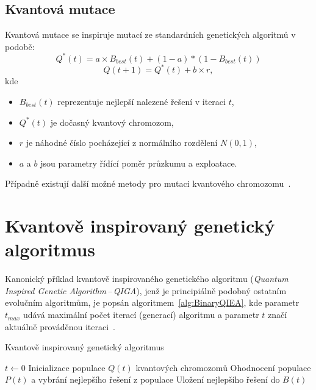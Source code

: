 \subsection{Kvantová mutace}\label{subsec:quantum-mutation}
Kvantová mutace se inspiruje mutací ze standardních genetických algoritmů v podobě:
\begin{equation*}
    Q^*(t) = a \times B_{best}(t) + (1 - a) * (1 - B_{best}(t))
\end{equation*}
\begin{equation*}
    Q(t+1) = Q^*(t) + b \times r,
\end{equation*}
kde
\begin{itemize}
    \item $B_{best}(t)$ reprezentuje nejlepší nalezené řešení v iteraci $t$,
    \item $Q^*(t)$ je dočasný kvantový chromozom,
    \item $r$ je náhodné číslo pocházející z normálního rozdělení $N(0,1)$,
    \item $a$ a $b$ jsou parametry řídící poměr průzkumu a exploatace.
\end{itemize}
Případně existují další možné metody pro mutaci kvantového chromozomu~\cite{NaturalComputing}.

\section{Kvantově inspirovaný genetický algoritmus}\label{sec:qiga}
Kanonický příklad kvantově inspirovaného genetického algoritmu (\emph{Quantum Inspired Genetic Algorithm\,--\,QIGA}), jenž je principiálně podobný ostatním evolučním algoritmům, je popsán algoritmem~\ref{alg:BinaryQIEA}, kde parametr $t_{max}$ udává maximální počet iterací (generací) algoritmu a parametr $t$ značí aktuálně prováděnou iteraci~\cite{NaturalComputing}. 

\begin{algorithm}[ht]
    \caption{Kvantově inspirovaný genetický algoritmus~\cite{NaturalComputing}}
    \label{alg:BinaryQIEA}
    $t \gets 0$\;
    Inicializace populace $Q(t)$ kvantových chromozomů\;
    Ohodnocení populace $P(t)$ a vybrání nejlepšího řešení z populace\;
    Uložení nejlepšího řešení do $B(t)$\;
\end{algorithm}

